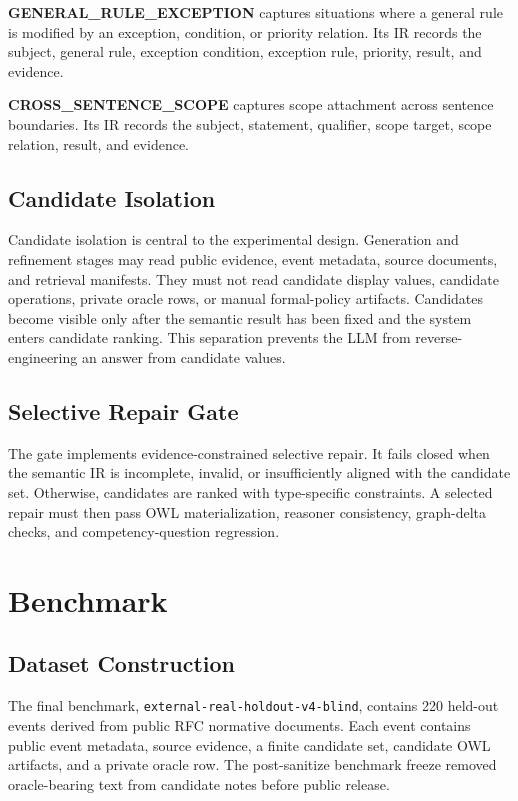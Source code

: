 \documentclass[11pt]{article}
\begin{document}
\textbf{GENERAL\_RULE\_EXCEPTION} captures situations where a general rule is modified by an exception, condition, or priority relation. Its IR records the subject, general rule, exception condition, exception rule, priority, result, and evidence.

\textbf{CROSS\_SENTENCE\_SCOPE} captures scope attachment across sentence boundaries. Its IR records the subject, statement, qualifier, scope target, scope relation, result, and evidence.

\subsection{Candidate Isolation}

Candidate isolation is central to the experimental design. Generation and refinement stages may read public evidence, event metadata, source documents, and retrieval manifests. They must not read candidate display values, candidate operations, private oracle rows, or manual formal-policy artifacts. Candidates become visible only after the semantic result has been fixed and the system enters candidate ranking. This separation prevents the LLM from reverse-engineering an answer from candidate values.

\subsection{Selective Repair Gate}

The gate implements evidence-constrained selective repair. It fails closed when the semantic IR is incomplete, invalid, or insufficiently aligned with the candidate set. Otherwise, candidates are ranked with type-specific constraints. A selected repair must then pass OWL materialization, reasoner consistency, graph-delta checks, and competency-question regression.

\section{Benchmark}

\subsection{Dataset Construction}

The final benchmark, \texttt{external-real-holdout-v4-blind}, contains 220 held-out events derived from public RFC normative documents. Each event contains public event metadata, source evidence, a finite candidate set, candidate OWL artifacts, and a private oracle row. The post-sanitize benchmark freeze removed oracle-bearing text from candidate notes before public release.
\end{document}
